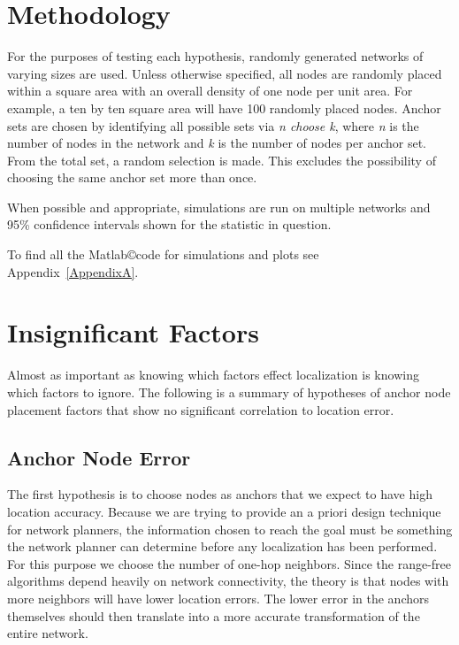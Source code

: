 \section{Methodology}
For the purposes of testing each hypothesis, randomly generated networks of varying sizes are used.  Unless otherwise specified, all nodes are randomly placed within a square area with an overall density of one node per unit area.  For example, a ten by ten square area will have 100 randomly placed nodes.  Anchor sets are chosen by identifying all possible sets via \emph{n choose k}, where \emph{n} is the number of nodes in the network and \emph{k} is the number of nodes per anchor set.  From the total set, a random selection is made.  This excludes the possibility of choosing the same anchor set more than once.

When possible and appropriate, simulations are run on multiple networks and 95\% confidence intervals shown for the statistic in question.  

To find all the Matlab\copyright code for simulations and plots see Appendix~\ref{AppendixA}.

\section{Insignificant Factors}
Almost as important as knowing which factors effect localization is knowing which factors to ignore.
The following is a summary of hypotheses of anchor node placement factors that show no significant correlation to location error.  

\subsection{Anchor Node Error}
The first hypothesis is to choose nodes as anchors that we expect to have high location accuracy. Because we are trying to provide an a priori design technique for network planners, the information chosen to reach the goal must be something the network planner can determine before any localization has been performed.  For this purpose we choose the number of one-hop neighbors.  Since the range-free algorithms depend heavily on network connectivity, the theory is that nodes with more neighbors will have lower location errors.  The lower error in the anchors themselves should then translate into a more accurate transformation of the entire network.

